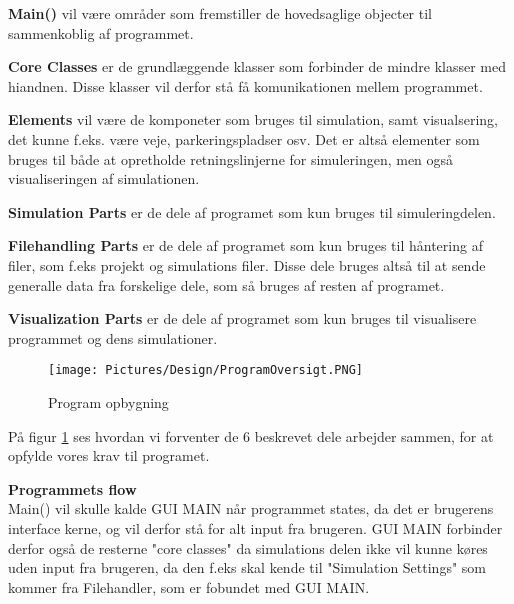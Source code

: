 \textbf{Main()} vil være områder som fremstiller de hovedsaglige objecter til sammenkoblig af programmet.

\vspace{5mm}

\textbf{Core Classes} er de grundlæggende klasser som forbinder de mindre klasser med hiandnen. Disse klasser vil derfor stå få komunikationen mellem programmet.

\vspace{5mm}

\textbf{Elements} vil være de komponeter som bruges til simulation, samt visualsering, det kunne f.eks. være veje, parkeringspladser osv. Det er altså elementer som bruges til både at opretholde retningslinjerne for simuleringen, men også visualiseringen af simulationen.

\vspace{5mm}

\textbf{Simulation Parts} er de dele af programet som kun bruges til simuleringdelen.

\vspace{5mm}

\textbf{Filehandling Parts} er de dele af programet som kun bruges til håntering af filer, som f.eks projekt og simulations filer. Disse dele bruges altså til at sende generalle data fra forskelige dele, som så bruges af resten af programet.  

\vspace{5mm}

\textbf{Visualization Parts} er de dele af programet som kun bruges til visualisere programmet og dens simulationer.

\begin{figure}[H]
\begin{adjustbox}{width=1.0\textwidth,center=\textwidth}
\centering
\texttt{[image: Pictures/Design/ProgramOversigt.PNG]}
\end{adjustbox}
\caption{Program opbygning}
\label{fig:ProgramOversigt}
\end{figure}

\vspace{5mm}

På figur \ref{fig:ProgramOversigt} ses hvordan vi forventer de 6 beskrevet dele arbejder sammen, for at opfylde vores krav til programet.

\vspace{5mm}

\textbf{Programmets flow} \\
Main() vil skulle kalde GUI MAIN når programmet states, da det er brugerens interface kerne, og vil derfor stå for alt input fra brugeren. GUI MAIN forbinder derfor også de resterne "core classes" da simulations delen ikke vil kunne køres uden input fra brugeren, da den f.eks skal kende til "Simulation Settings" som kommer fra Filehandler, som er fobundet med GUI MAIN. \\

